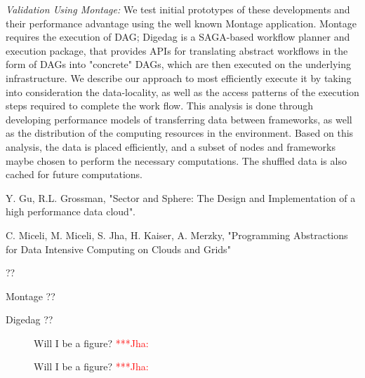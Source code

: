 \documentclass[a4paper,11pt]{article}
\newcommand{\jhanote}[1]{ {\textcolor{red} { ***Jha: #1 }}}
\newcommand{\jhanote}[1]{}
\begin{document}
{\it Validation Using Montage: } We test initial prototypes of these developments and their performance advantage using the well known Montage application.  Montage requires the execution of DAG;
Digedag is a SAGA-based workflow planner and execution package, that provides APIs for translating abstract workflows in the form of DAGs into "concrete" DAGs, which are then executed on the underlying infrastructure.
We describe our approach to most efficiently execute it by taking into consideration the data-locality, as well as the access patterns of the execution steps required to complete the work flow. This analysis is done through developing performance models of transferring data between frameworks, as well as the distribution of the computing resources in the environment. Based on this analysis, the data is placed efficiently, and a subset of nodes and frameworks maybe chosen to perform the necessary computations. The shuffled data is also cached for future computations.




\begin{thebibliography}{99}
\newblock Y. Gu, R.L. Grossman, "Sector and Sphere: The Design and Implementation of a high performance data cloud".

\newblock C. Miceli, M. Miceli, S. Jha, H. Kaiser, A. Merzky, "Programming Abstractions for Data Intensive Computing on Clouds and Grids"

\newblock ??

\newblock Montage ??

\newblock Digedag ??

\end{thebibliography}

\vspace{12pt}



\begin{figure}
\centering
\caption{Will I be a figure? \jhanote{}}
\end{figure}

\begin{figure}
\centering
\caption{Will I be a figure? \jhanote{}}
\end{figure}

\noindent
\end{document}

